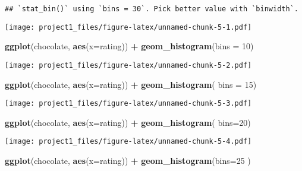 \documentclass[
]{article}
\newenvironment{Shaded}{\begin{snugshade}}{\end{snugshade}}
\newcommand{\AttributeTok}[1]{\textcolor[rgb]{0.13,0.29,0.53}{#1}}
\newcommand{\DecValTok}[1]{\textcolor[rgb]{0.00,0.00,0.81}{#1}}
\newcommand{\FunctionTok}[1]{\textcolor[rgb]{0.13,0.29,0.53}{\textbf{#1}}}
\newcommand{\NormalTok}[1]{#1}
\newcommand{\SpecialCharTok}[1]{\textcolor[rgb]{0.81,0.36,0.00}{\textbf{#1}}}
\begin{document}
\begin{verbatim}
## `stat_bin()` using `bins = 30`. Pick better value with `binwidth`.
\end{verbatim}

\texttt{[image: project1\_files/figure-latex/unnamed-chunk-5-1.pdf]}

\begin{Shaded}
\begin{Highlighting}[]
\FunctionTok{ggplot}\NormalTok{(chocolate, }\FunctionTok{aes}\NormalTok{(}\AttributeTok{x=}\NormalTok{rating)) }\SpecialCharTok{+} \FunctionTok{geom\_histogram}\NormalTok{(}\AttributeTok{bins =} \DecValTok{10}\NormalTok{)}
\end{Highlighting}
\end{Shaded}

\texttt{[image: project1\_files/figure-latex/unnamed-chunk-5-2.pdf]}

\begin{Shaded}
\begin{Highlighting}[]
\FunctionTok{ggplot}\NormalTok{(chocolate, }\FunctionTok{aes}\NormalTok{(}\AttributeTok{x=}\NormalTok{rating)) }\SpecialCharTok{+} \FunctionTok{geom\_histogram}\NormalTok{(}
\AttributeTok{bins =} \DecValTok{15}\NormalTok{)}
\end{Highlighting}
\end{Shaded}

\texttt{[image: project1\_files/figure-latex/unnamed-chunk-5-3.pdf]}

\begin{Shaded}
\begin{Highlighting}[]
\FunctionTok{ggplot}\NormalTok{(chocolate, }\FunctionTok{aes}\NormalTok{(}\AttributeTok{x=}\NormalTok{rating)) }\SpecialCharTok{+} \FunctionTok{geom\_histogram}\NormalTok{(}
\AttributeTok{bins=}\DecValTok{20}\NormalTok{)}
\end{Highlighting}
\end{Shaded}

\texttt{[image: project1\_files/figure-latex/unnamed-chunk-5-4.pdf]}

\begin{Shaded}
\begin{Highlighting}[]
\FunctionTok{ggplot}\NormalTok{(chocolate, }\FunctionTok{aes}\NormalTok{(}\AttributeTok{x=}\NormalTok{rating)) }\SpecialCharTok{+} \FunctionTok{geom\_histogram}\NormalTok{(}\AttributeTok{bins=}\DecValTok{25}
\NormalTok{)}
\end{Highlighting}
\end{Shaded}
\end{document}
